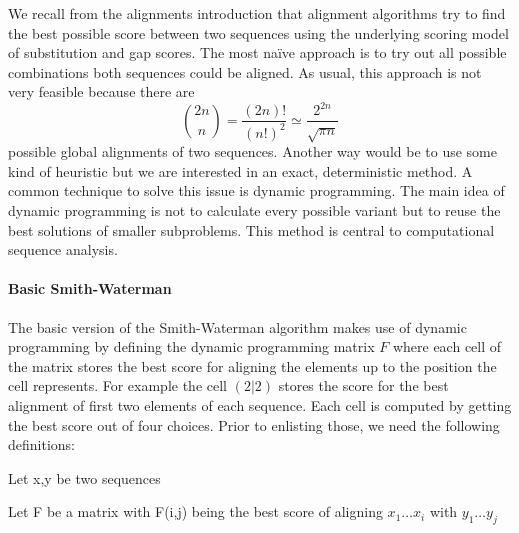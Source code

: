 We recall from the alignments introduction that alignment algorithms try to find the best possible score between two sequences using the underlying scoring model of substitution and gap scores.
The most na\"ive approach is to try out all possible combinations both sequences could be aligned. As usual, this approach is not very feasible because there are 
\begin{equation*}
	\binom{2n}{n} = \frac{(2n)!}{(n!)^2} \simeq \frac{2^{2n}}{\sqrt{\pi n}}
\end{equation*}
possible global alignments of two sequences\cite{durbin1998}. 
Another way would be to use some kind of heuristic but we are interested in an exact, deterministic method.
A common technique to solve this issue is dynamic programming\cite{bellman1957}. 
The main idea of dynamic programming is not to calculate every possible variant but to reuse the best solutions of smaller subproblems.  
This method is central to computational sequence analysis\cite{durbin1998}.

\paragraph{Basic Smith-Waterman}
The basic version of the Smith-Waterman algorithm makes use of dynamic programming by defining the dynamic programming matrix $F$ where each cell of the matrix stores the best score for aligning the elements up to the position the cell represents.
For example the cell $(2|2)$ stores the score for the best alignment of first two elements of each sequence. 
Each cell is computed by getting the best score out of four choices. Prior to enlisting those, we need the following definitions: 

\begin{definition}
	\item Let x,y be two sequences
	\item Let F be a matrix with F(i,j) being the best score of aligning $x_1\dots x_i$ with $y_1\dots y_j$
\end{definition}

